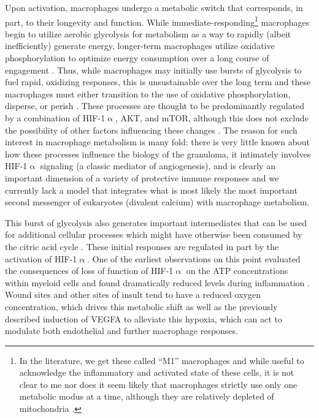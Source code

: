 Upon activation, macrophages undergo a metabolic switch that corresponds, in part, to their longevity and function. While immediate-responding\footnote{In the literature, we get these called ``M1'' macrophages and while useful to acknowledge the inflammatory and activated state of these cells, it is not clear to me nor does it seem likely that macrophages strictly use only one metabolic modus at a time, although they are relatively depleted of mitochondria \citep{Biswas2012}.} macrophages begin to utilize aerobic glycolysis for metabolism as a way to rapidly (albeit inefficiently) generate energy, longer-term macrophages utilize oxidative phosphorylation to optimize energy consumption over a long course of engagement \citep{Kiran2016, Viola2019, Langston2017}. Thus, while macrophages may initially use bursts of glycolysis to fuel rapid, oxidizing responses, this is unsustainable over the long term and these macrophages must either transition to the use of oxidative phosphorylation, disperse, or perish \citep{Odegaard2011, Howard2020}. These processes are thought to be predominantly regulated by a combination of HIF-1$\upalpha$, AKT, and mTOR, although this does not exclude the possibility of other factors influencing these changes \citep{Covarrubias2015}. The reason for such interest in macrophage metabolism is many fold: there is very little known about how these processes influence the biology of the granuloma, it intimately involves HIF-1$\upalpha$ signaling (a classic mediator of angiogenesis), and is clearly an important dimension of a variety of protective immune responses and we currently lack a model that integrates what is most likely the most important second messenger of eukaryotes (divalent calcium) with macrophage metabolism.

This burst of glycolysis also generates important intermediates that can be used for additional cellular processes which might have otherwise been consumed by the citric acid cycle \citep{Viola2019, Kelly2015}. These initial responses are regulated in part by the activation of HIF-1$\upalpha$. One of the earliest observations on this point evaluated the consequences of loss of function of HIF-1$\upalpha$ on the ATP concentrations within myeloid cells and found dramatically reduced levels during inflammation \citep{Cramer2003}. Wound sites and other sites of insult tend to have a reduced oxygen concentration, which drives this metabolic shift as well as the previously described induction of VEGFA to alleviate this hypoxia, which can act to modulate both endothelial and further macrophage responses. 

